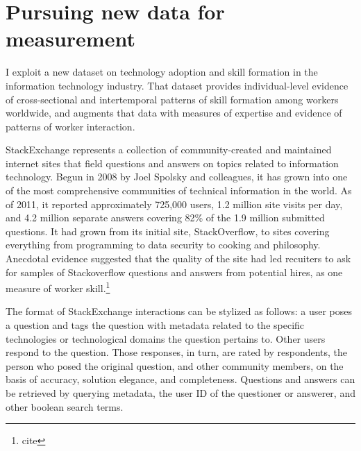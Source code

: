\documentclass[11pt]{article}
\begin{document}
\section{Pursuing new data for measurement}
\label{sec:data}

I exploit a new dataset on technology adoption and skill formation in
the information technology industry. That dataset provides
individual-level evidence of cross-sectional and intertemporal
patterns of skill formation among workers worldwide, and augments that
data with measures of expertise and evidence of patterns of worker
interaction. 

StackExchange represents a collection of community-created and
maintained internet sites that field questions and answers on topics related to information
technology. Begun in 2008 by Joel Spolsky and colleagues, it has grown
into one of the most comprehensive communities of technical
information in the world. As of 2011, it reported approximately
725,000 users, 1.2 million site visits per day, and 4.2 million separate
answers covering 82\%  of the 1.9 million submitted questions. It had grown from its initial site,
StackOverflow, to sites covering everything
from programming to data security to cooking and philosophy. Anecdotal
evidence suggested that the quality of the site had led recuiters to
ask for samples of Stackoverflow questions and answers from potential
hires, as one measure of worker skill.\footnote{cite}

The format of StackExchange interactions can be stylized as follows: a
user poses a question and tags the question with metadata related to
the specific technologies or technological domains the question
pertains to. Other users respond to the question. Those responses, in
turn, are rated by respondents, the person who posed the original
question, and other community members, on the basis of accuracy,
solution elegance, and completeness. Questions and answers can be
retrieved by querying metadata, the user ID of the questioner or
answerer, and other boolean search terms. 
\end{document}
